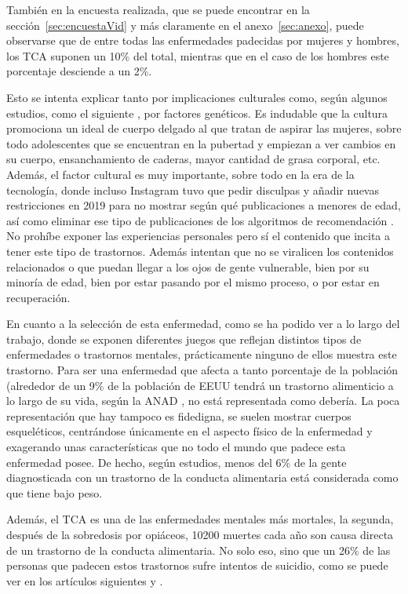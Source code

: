 \documentclass[12pt, a4paper,twoside,titlepage]{book}
\begin{document}
\begin{itemize}
{     También en la encuesta realizada, que se puede encontrar en la sección~\ref{sec:encuestaVid} y más claramente en el anexo~\ref{sec:anexo}, puede observarse que de entre todas las enfermedades padecidas por mujeres y hombres, los TCA suponen un 10\% del total, mientras que en el caso de los hombres este porcentaje desciende a un 2\%. 
     
    Esto se intenta explicar tanto por implicaciones culturales como, según algunos estudios, como el siguiente \cite{articuloTCA3}, por factores genéticos. Es indudable que la cultura promociona un ideal de cuerpo delgado al que tratan de aspirar las mujeres, sobre todo adolescentes que se encuentran en la pubertad y empiezan a ver cambios en su cuerpo, ensanchamiento de caderas, mayor cantidad de grasa corporal, etc. Además, el factor cultural es muy importante, sobre todo en la era de la tecnología, donde incluso Instagram tuvo que pedir disculpas y añadir nuevas restricciones en 2019 para no mostrar según qué publicaciones a menores de edad, así como eliminar ese tipo de publicaciones de los algoritmos de recomendación \cite{articuloTCA4}. No prohíbe exponer las experiencias personales pero sí el contenido que incita a tener este tipo de trastornos. Además intentan que no se viralicen los contenidos relacionados o que puedan llegar a los ojos de gente vulnerable, bien por su minoría de edad, bien por estar pasando por el mismo proceso, o por estar en recuperación. 
    
    En cuanto a la selección de esta enfermedad, como se ha podido ver a lo largo del trabajo, donde se exponen diferentes juegos que reflejan distintos tipos de enfermedades o trastornos mentales, prácticamente ninguno de ellos muestra este trastorno. Para ser una enfermedad que afecta a tanto porcentaje de la población (alrededor de un 9\% de la población de EEUU tendrá un trastorno alimenticio a lo largo de su vida, según la ANAD \cite{articuloTCA5}, no está representada como debería. La poca representación que hay tampoco es fidedigna, se suelen mostrar cuerpos esqueléticos, centrándose únicamente en el aspecto físico de la enfermedad y exagerando unas características que no todo el mundo que padece esta enfermedad posee. De hecho, según estudios, menos del 6\% de la gente diagnosticada con un trastorno de la conducta alimentaria está considerada como que tiene bajo peso. 
    
    Además, el TCA es una de las enfermedades mentales más mortales, la segunda, después de la sobredosis por opiáceos, 10200 muertes cada año son causa directa de un trastorno de la conducta alimentaria. No solo eso, sino que un 26\% de las personas que padecen estos trastornos sufre intentos de suicidio, como se puede ver en los artículos siguientes \cite{articuloTCA6} y \cite{articuloTCA7}. 
    
}
\end{itemize}
\end{document}
